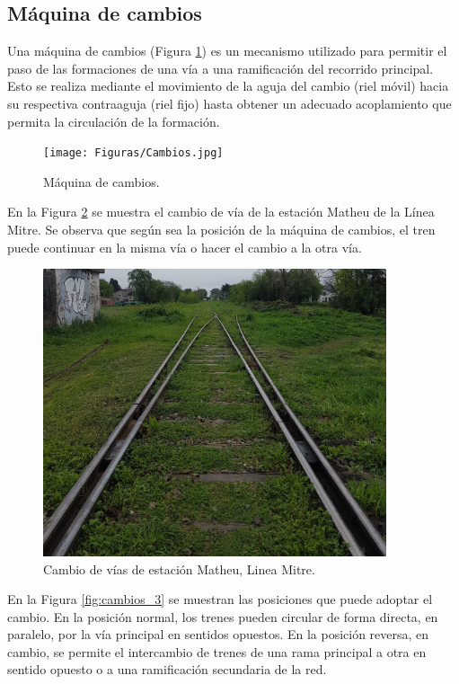 \subsection{Máquina de cambios}
    \label{sec:switches}
 
    Una máquina de cambios (Figura \ref{fig:cambios_1}) es un mecanismo utilizado para permitir el paso de las formaciones de una vía a una ramificación del recorrido principal. Esto se realiza mediante el movimiento de la aguja del cambio (riel móvil) hacia su respectiva contraaguja (riel fijo) hasta obtener un adecuado acoplamiento que permita la circulación de la formación.

    \begin{figure}[!h]
        \centering
        \texttt{[image: Figuras/Cambios.jpg]}
        \centering\caption{Máquina de cambios.}
        \label{fig:cambios_1}
    \end{figure}

    En la Figura \ref{fig:cambios_2} se muestra el cambio de vía de la estación Matheu de la Línea Mitre. Se observa que según sea la posición de la máquina de cambios, el tren puede continuar en la misma vía o hacer el cambio a la otra vía.

    \begin{figure}[!h]
        \centering
        \includegraphics[width=0.9\textwidth]{Figuras/Cambios_2.jpg}
        \centering\caption{Cambio de vías de estación Matheu, Linea Mitre.}
        \label{fig:cambios_2}
    \end{figure}

    En la Figura \ref{fig:cambios_3} se muestran las posiciones que puede adoptar el cambio. En la posición normal, los trenes pueden circular de forma directa, en paralelo, por la vía principal en sentidos opuestos. En la posición reversa, en cambio, se permite el intercambio de trenes de una rama principal a otra en sentido opuesto o a una ramificación secundaria de la red.

